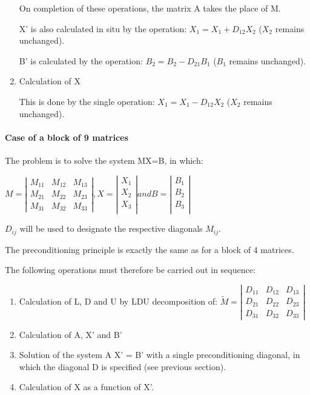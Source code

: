 \begin{enumerate}
On completion of these operations, the matrix A takes the place of M.

X' is also calculated in situ by the operation: $X_{1} = X_{1} + D_{12} X_{2}$
($X_{2}$ remains unchanged).

B' is calculated by the operation: $B_{2} = B_{2} - D_{21} B_{1}$  ($B_{1}$
remains unchanged).

\setcounter{enumi}{3}
\item Calculation of X

This is done by the single operation: $X_{1} = X_{1} - D_{12} X_{2}$  ($X_{2}$
remains unchanged).
\end{enumerate}

\paragraph{Case of a block of 9 matrices}

The problem is to solve the system MX=B, in which:

$M =
\left|
\begin{array}{ccc}
  M_{11} & M_{12} & M_{13} \\
  M_{21} & M_{22} & M_{23} \\
  M_{31} & M_{32} & M_{33}
\end{array}
\right|,
X =
\left|
\begin{array}{ccc}
  X_{1}  \\
  X_{2}  \\
  X_{3}  \\
\end{array}
\right|
and B =
\left|
\begin{array}{ccc}
  B_{1}  \\
  B_{2}  \\
  B_{3}  \\
\end{array}
\right|
$

$D_{ij}$  will be used to designate the respective diagonals $M_{ij}$.

The preconditioning principle is exactly the same as for a block of 4 matrices.

The following operations must therefore be carried out in sequence:

\begin{enumerate}
  \item  Calculation of L, D and U by LDU decomposition of:
    $\tilde{M}=\left|
     \begin{array}{ccc}
       {D_{11} } & {D_{12} } & {D_{13} } \\
       {D_{21} } & {D_{22} } & {D_{23} } \\
       {D_{31} } & {D_{32} } & {D_{33} }
    \end{array}\right|$
  \item Calculation of A, X' and B'
  \item Solution of the system A X' = B' with a single preconditioning
    diagonal, in which the diagonal D is specified (see previous section).
  \item Calculation of X as a function of X'.

\end{enumerate}


